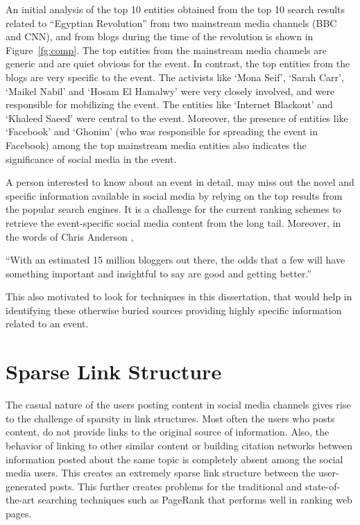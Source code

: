 An initial analysis of the top 10 entities obtained from the top 10 search results related to ``Egyptian Revolution'' from two mainstream media channels (BBC and CNN), and from blogs during the time of the revolution is shown in Figure~\ref{fg:comp}. The top entities from the mainstream media channels are generic and are quiet obvious for the event. In contrast, the top entities from the blogs are very specific to the event. The activists like `Mona Seif', `Sarah Carr', `Maikel Nabil' and `Hosam El Hamalwy' were very closely involved, and were responsible for mobilizing the event. The entities like `Internet Blackout' and `Khaleed Saeed' were central to the event. Moreover, the presence of entities like `Facebook' and `Ghonim' (who was responsible for spreading the event in Facebook) among the top mainstream media entities also indicates the significance of social media in the event.

A person interested to know about an event in detail, may miss out the novel and specific information available in social media by relying on the top results from the popular search engines. It is a challenge for the current ranking schemes to retrieve the event-specific social media content from the long tail. Moreover, in the words of Chris Anderson \cite{anderson2008long}, \begin{itshape} ``With an estimated 15 million bloggers out there, the odds that a few will have something important and insightful to say are good and getting better.'' \end{itshape} This also motivated to look for techniques in this dissertation, that would help in identifying these otherwise buried sources providing highly specific information related to an event.

\section{Sparse Link Structure}
The casual nature of the users posting content in social media channels gives rise to the challenge of sparsity in link structures. Most often the users who posts content, do not provide links to the original source of information. Also, the behavior of linking to other similar content or building citation networks between information posted about the same topic is completely absent among the social media users. This creates an extremely sparse link structure between the user-generated posts. This further creates problems for the traditional and state-of-the-art searching techniques such as PageRank \cite{brin1998anatomy} that performs well in ranking web pages.

